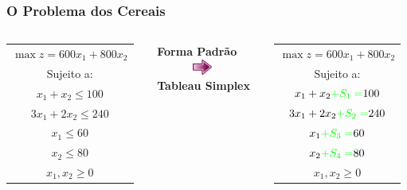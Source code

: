\documentclass{beamer}
\begin{document}
\begin{frame}
	\frametitle{O Problema dos Cereais}
	\begin{columns}
		\begin{column}{4cm}
			\scriptsize
			\begin{table}
				\begin{tabular}{c}
					\cellcolor{red!50} $ \max z = 600x_1 + 800x_2 $ \\
					\cellcolor{red!50} Sujeito a: \\
					\cellcolor{red!50} $x_1 + x_2 \le 100$ \\
					\cellcolor{red!50} $3x_1 + 2x_2 \le 240$ \\
					\cellcolor{red!50} $x_1 \le 60 $ \\
					\cellcolor{red!50} $x_2 \le 80 $ \\
				    \cellcolor{red!50} $x_1, x_2 \ge 0 $ \\
				\end{tabular}
			\end{table}
		\end{column} \pause
		\begin{column}{3cm}
			\centering
			\textbf{Forma Padrão} \\
			\includegraphics[width=3cm,height=0.5cm]{seta.png} \\
			\textbf{Tableau Simplex} \\
		\end{column}
		\begin{column}{4cm}
			\scriptsize
			\begin{table}
				\begin{tabular}{c}
					\cellcolor{red!50} $ \max z = 600x_1 + 800x_2 $ \\
					\cellcolor{red!50} Sujeito a: \\
					\cellcolor{red!50} $x_1 + x_2 {\color{green}+ S_1 =}  100$ \\
					\cellcolor{red!50} $3x_1 + 2x_2 {\color{green}+ S_2 =}  240$ \\
					\cellcolor{red!50} $x_1 {\color{green}+ S_3 =}  60 $  \\
					\cellcolor{red!50} $x_2 {\color{green}+ S_4 =}  80 $ \\
				    \cellcolor{red!50} $x_1, x_2 \ge 0 $ \\
				\end{tabular}
			\end{table}
		\end{column} \pause
	\end{columns}
	

\end{frame}
\end{document}
